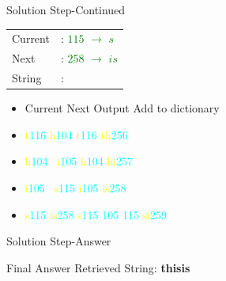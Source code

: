 \documentclass{beamer}
\newenvironment{finalanswer}{\begin{block}{Final Answer}}{\end{block}} %
\begin{document}
\begin{frame}{Solution Step-Continued}
\begin{tabular}{ll}
 Current  & :   \textcolor{green}{$115$ $\rightarrow$ \textbf{$s$}} \\
    Next  & :   \textcolor{green}{$258$ $\rightarrow$ \textbf{$is$}} \\
    String & : \textcolor{white}{thisis}
    
\end{tabular}
    \begin{itemize}
        \item \quad\quad Current \quad\quad\quad\quad Next \quad\quad\quad\quad Output \quad\quad\quad\quad Add to dictionary
    \item  \quad\quad \textcolor{yellow}{t}\:\textcolor{cyan}{116} \quad\quad\quad\qquad\: \textcolor{yellow}{h}\:\textcolor{cyan}{104} \quad\quad\qquad \textcolor{yellow}{t}\:\textcolor{cyan}{116} \quad\quad\quad\qquad\: \textcolor{yellow}{th}\:\textcolor{cyan}{256}
    \item  \quad\quad \textcolor{yellow}{h}\:\textcolor{cyan}{104} \quad\quad\quad\qquad\, \textcolor{yellow}{i}\:\textcolor{cyan}{105} \quad\quad\qquad \textcolor{yellow}{h}\:\textcolor{cyan}{104} \quad\quad\quad\qquad\: \textcolor{yellow}{hi}\:\textcolor{cyan}{257}
    \item  \quad\quad \textcolor{yellow}{i}\:\textcolor{cyan}{105} \quad\quad\quad\qquad\;\, \textcolor{yellow}{s}\:\textcolor{cyan}{115} \quad\quad\qquad \textcolor{yellow}{i}\:\textcolor{cyan}{105} \quad\quad\quad\qquad\; \textcolor{yellow}{is}\:\textcolor{cyan}{258}
   \item  \quad\quad \textcolor{yellow}{s}\:\textcolor{cyan}{115} \quad\quad\quad\qquad\; \textcolor{yellow}{is}\:\textcolor{cyan}{258} \quad\qquad \textcolor{yellow}{s}\:\textcolor{cyan}{115 105 115} \qquad\: \textcolor{yellow}{si}\:\textcolor{cyan}{259}


    \end{itemize}
    
\end{frame}
\begin{frame}{Solution Step-Answer}
    \begin{finalanswer}
           Retrieved String: \textbf{thisis}

    \end{finalanswer}
\end{frame}
\end{document}
